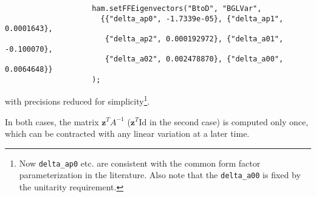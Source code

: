 \begin{enumerate}
\begin{itemize}
                \begin{lstlisting}
                    ham.setFFEigenvectors("BtoD", "BGLVar",
                      {{"delta_ap0", -1.7339e-05}, {"delta_ap1", 0.0001643},
                       {"delta_ap2", 0.000192972}, {"delta_a01", -0.100070},
                       {"delta_a02", 0.002478870}, {"delta_a00", 0.0064648}}
                    );
                \end{lstlisting}

                with precisions reduced for simplicity\footnote{
                    Now \lstinline{delta_ap0} etc. are consistent with the common
                    form factor parameterization in the literature.
                    Also note that the \lstinline{delta_a00} is fixed by the
                    unitarity requirement.
                }.
        \end{itemize}

        In both cases, the matrix $\bm{z}^T A^{-1}$
        ($\bm{z}^T \text{Id}$ in the second case) is computed only once,
        which can be contracted with any linear variation at a later time.
\end{enumerate}
